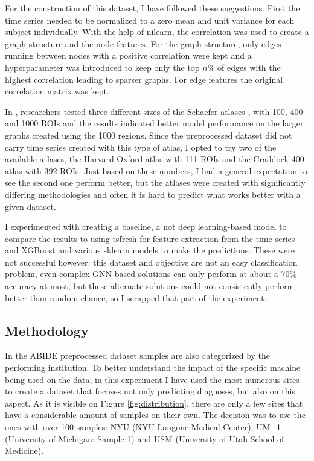 	For the construction of this dataset, I have followed these suggestions. First the time series needed to be normalized to a zero mean and unit variance for each subject individually. With the help of nilearn, the correlation was used to create a graph structure and the node features. For the graph structure, only edges running between nodes with a positive correlation were kept and a hyperparameter was introduced to keep only the top $n\%$ of edges with the highest correlation leading to sparser graphs. For edge features the original correlation matrix was kept.
	
	In \cite{said2023neurograph}, researchers tested three different sizes of the Schaefer atlases \cite{schaefer2018local}, with 100, 400 and 1000 ROIs and the results indicated better model performance on the larger graphs created using the 1000 regions. Since the preprocessed dataset did not carry time series created with this type of atlas, I opted to try two of the available atlases, the Harvard-Oxford atlas \cite{desikan2006automated} with 111 ROIs and the Craddock 400 atlas \cite{craddock2012whole} with 392 ROIs. Just based on these numbers, I had a general expectation to see the second one perform better, but the atlases were created with significantly differing methodologies and often it is hard to predict what works better with a given dataset.
	
	I experimented with creating a baseline, a not deep learning-based model to compare the results to using tsfresh for feature extraction from the time series and XGBoost and various sklearn models to make the predictions. These were not successful however: this dataset and objective are not an easy classification problem, even complex GNN-based solutions can only perform at about a 70\% accuracy at most, but these alternate solutions could not consistently perform better than random chance, so I scrapped that part of the experiment.
	
	\subsection{Methodology}
	
	In the ABIDE preprocessed dataset samples are also categorized by the performing institution. To better understand the impact of the specific machine being used on the data, in this experiment I have used the most numerous sites to create a dataset that focuses not only predicting diagnoses, but also on this aspect. As it is visible on Figure \ref{fig:distribution}, there are only a few sites that have a considerable amount of samples on their own. The decision was to use the ones with over 100 samples: NYU (NYU Langone Medical Center), UM\_1 (University of Michigan: Sample 1) and USM (University of Utah School of Medicine).
	
